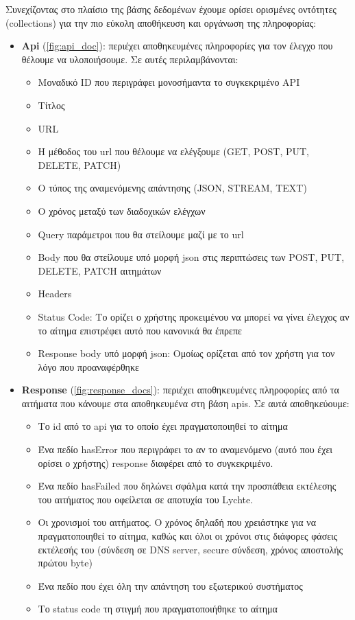 Συνεχίζοντας στο πλαίσιο της βάσης δεδομένων έχουμε ορίσει ορισμένες οντότητες (collections) για την πιο εύκολη αποθήκευση και οργάνωση της πληροφορίας:

\begin{itemize}
    \item \textbf{Api} (\autoref{fig:api_doc}): περιέχει αποθηκευμένες πληροφορίες για τον έλεγχο που θέλουμε να υλοποιήσουμε. Σε αυτές περιλαμβάνονται:
        \begin{itemize}
            \item Μοναδικό ID που περιγράφει μονοσήμαντα το συγκεκριμένο API
            \item Tίτλος
            \item URL
            \item H μέθοδος του url που θέλουμε να ελέγξουμε (GET, POST, PUT, DELETE, PATCH)
            \item O τύπος της αναμενόμενης απάντησης (JSON, STREAM, TEXT)
            \item Ο χρόνος μεταξύ των διαδοχικών ελέγχων
            \item Query παράμετροι που θα στείλουμε μαζί με το url
            \item Body που θα στείλουμε υπό μορφή json στις περιπτώσεις των POST, PUT, DELETE, PATCH αιτημάτων
            \item Headers
            \item Status Code: Το ορίζει ο χρήστης προκειμένου να μπορεί να γίνει έλεγχος αν το αίτημα επιστρέφει αυτό που κανονικά θα έπρεπε
            \item Response body υπό μορφή json: Ομοίως ορίζεται από τον χρήστη για τον λόγο που προαναφέρθηκε 
        \end{itemize}
    \item \textbf{Response} (\autoref{fig:response_docs}): περιέχει αποθηκευμένες πληροφορίες από τα αιτήματα που κάνουμε στα αποθηκευμένα στη βάση apis. Σε αυτά αποθηκεύουμε:
        \begin{itemize}
            \item Το id από το api για το οποίο έχει πραγματοποιηθεί το αίτημα
            \item Ένα πεδίο hasError που περιγράφει το αν το αναμενόμενο (αυτό που έχει ορίσει ο χρήστης) response διαφέρει από το συγκεκριμένο.
            \item Ένα πεδίο hasFailed που δηλώνει σφάλμα κατά την προσπάθεια εκτέλεσης του αιτήματος που οφείλεται σε αποτυχία του Lychte.
            \item Οι χρονισμοί του αιτήματος. Ο χρόνος δηλαδή που χρειάστηκε για να πραγματοποιηθεί το αίτημα, καθώς και όλοι οι χρόνοι στις διάφορες φάσεις εκτέλεσής του (σύνδεση σε DNS server, secure σύνδεση, χρόνος αποστολής πρώτου byte)
            \item Ένα πεδίο που έχει όλη την απάντηση του εξωτερικού συστήματος
            \item Το status code τη στιγμή που πραγματοποιήθηκε το αίτημα
        \end{itemize}
\end{itemize}

